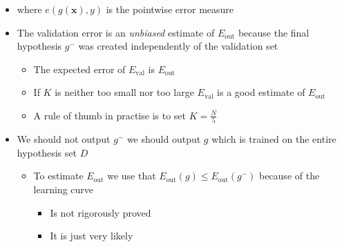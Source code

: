 \documentclass[11pt]{article}
\begin{document}
\begin{itemize}
\item where \(e(g(\pmb x),y)\) is the pointwise error measure

\item The validation error is an \emph{unbiased} estimate of \(E_\text{out}\) because the final hypothesis \(g^-\) was created independently of the validation set
\begin{itemize}
\item The expected error of \(E_\text{val}\) is \(E_\text{out}\)
\item If \(K\) is neither too small nor too large \(E_\text{val}\) is a good estimate of \(E_\text{out}\)
\item A rule of thumb in practise is to set \(K=\frac N5\)
\end{itemize}

\item We should not output \(g^-\) we should output \(g\) which is trained on the entire hypothesis set \(D\)
\begin{itemize}
\item To estimate \(E_\text{out}\) we use that \(E_\text{out}(g) \leq E_\text{out}(g^-)\) because of the learning curve
\begin{itemize}
\item Is not rigorously proved
\item It is just very likely
\end{itemize}
\end{itemize}
\end{itemize}
\end{document}
